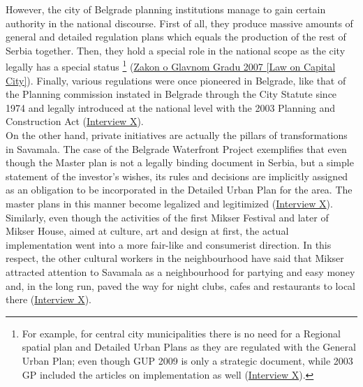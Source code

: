 \documentclass[11pt]{report}
\begin{document}
{{{{However, the city of Belgrade planning institutions manage to gain certain authority in the national discourse.
First of all, they produce massive amounts of general and detailed regulation plans which equals the production of the rest of Serbia together.
Then, they hold a special role in the national scope as the city legally has a special status
\footnote
{For example, for central city municipalities there is no need for a Regional spatial plan and Detailed Urban Plans as they are regulated with the General Urban Plan; even though GUP 2009 is only a strategic document, while 2003 GP included the articles on implementation as well (\href{InterviewX}{Interview X}).}
(\href{ref}{Zakon o Glavnom Gradu 2007 [Law on Capital City]}).
Finally, various regulations were once pioneered in Belgrade, like that of the Planning commission instated in Belgrade through the City Statute since 1974 and legally introduced at the national level with the 2003 Planning and Construction Act (\href{InterviewX}{Interview X}).
\\

On the other hand, private initiatives are actually the pillars of transformations in Savamala. The case of the Belgrade Waterfront Project exemplifies that even though the Master plan is not a legally binding document in Serbia, but a simple statement of the investor’s wishes, its rules and decisions are implicitly assigned as an obligation to be incorporated in the Detailed Urban Plan for the area. The master plans in this manner become legalized and legitimized (\href{InterviewX}{Interview X}).
\\

Similarly, even though the activities of the first Mikser Festival and later of Mikser House, aimed at culture, art and design at first, the actual implementation went into a more fair-like   and consumerist direction. In this respect, the other cultural workers in the neighbourhood have said that Mikser attracted attention to Savamala as a neighbourhood for partying and easy money and, in the long run, paved the way for night clubs, cafes and restaurants to local there
(\href{InterviewX}{Interview X}).
\\

}}}}
\end{document}

